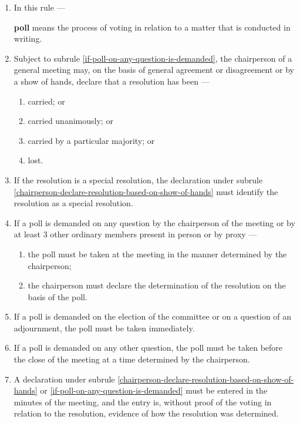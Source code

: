 \documentclass[../constitution.tex]{subfiles}
\begin{document}
\begin{enumerate}

  \item In this rule ---

        \textbf{poll} means the process of voting in relation to a matter that is conducted in writing.

  \item Subject to subrule \ref{if-poll-on-any-question-is-demanded}, the chairperson of a general meeting may, on the basis of general agreement or disagreement or by a show of hands, declare that a resolution has been --- \label{chairperson-declare-resolution-based-on-show-of-hands}

        \begin{enumerate}

          \item carried; or
          \item carried unanimously; or
          \item carried by a particular majority; or
          \item lost.
        \end{enumerate}
  \item If the resolution is a special resolution, the declaration under subrule \ref{chairperson-declare-resolution-based-on-show-of-hands} must identify the resolution as a special resolution.
  \item If a poll is demanded on any question by the chairperson of the meeting or by at least 3 other ordinary members present in person or by proxy --- \label{if-poll-on-any-question-is-demanded}

        \begin{enumerate}

          \item the poll must be taken at the meeting in the manner determined by the chairperson;
          \item the chairperson must declare the determination of the resolution on the basis of the poll.
        \end{enumerate}
  \item If a poll is demanded on the election of the committee or on a question of an adjournment, the poll must be taken immediately.
  \item If a poll is demanded on any other question, the poll must be taken before the close of the meeting at a time determined by the chairperson.
  \item A declaration under subrule \ref{chairperson-declare-resolution-based-on-show-of-hands} or \ref{if-poll-on-any-question-is-demanded} must be entered in the minutes of the meeting, and the entry is, without proof of the voting in relation to the resolution, evidence of how the resolution was determined.
\end{enumerate}
\end{document}
